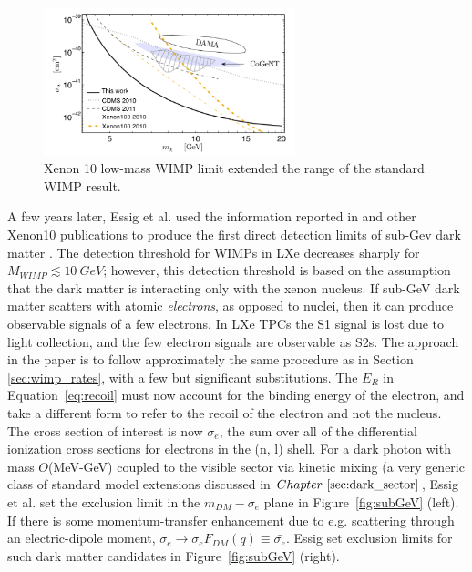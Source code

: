 \begin{figure}[htbp]
\begin{center}
\includegraphics[width=0.65\textwidth]{figures/lxetpcs/xenon10lowmass.png}
\caption{Xenon 10 low-mass WIMP limit extended the range of the standard WIMP result. }
\label{fig:xenon10lowmass}
\end{center}
\end{figure}


A few years later, Essig et al. used the information reported in \cite{Angle2011} and other Xenon10 publications to produce the first direct detection limits of sub-Gev dark matter \cite{Essig2012}. The detection threshold for \ac{WIMP}s in \ac{LXe} decreases sharply for $M_{WIMP} \lesssim 10~GeV$; however, this detection threshold is based on the assumption that the dark matter is interacting only with the xenon nucleus. If sub-GeV dark matter scatters with atomic \textit{electrons}, as opposed to nuclei, then it can produce observable signals of a few electrons. In \ac{LXe} \ac{TPC}s the S1 signal is lost due to light collection, and the few electron signals are observable as S2s. The approach in the paper is to follow approximately the same procedure as in Section~ \ref{sec:wimp_rates}, with a few but significant substitutions. The $E_{R}$ in Equation~\ref{eq:recoil} must now account for the binding energy of the electron, and take a different form to refer to the recoil of the electron and not the nucleus. The cross section of interest is now $\sigma_{e}$, the sum over all of the differential ionization cross sections for electrons in the (n, l) shell. For a dark photon with mass $O$(MeV-GeV) coupled to the visible sector via kinetic mixing (a very generic class of standard model extensions discussed in $Chapter~\ref{sec:dark_sector}$, Essig et al. set the exclusion limit in the $m_{DM}-\sigma_{e}$ plane in Figure~\ref{fig:subGeV} (left). If there is some momentum-transfer enhancement due to e.g. scattering through an electric-dipole moment, $\sigma_{e} \longrightarrow \sigma_{e}F_{DM}(q) \equiv \bar{\sigma_{e}}$. Essig set exclusion limits for such dark matter candidates in Figure~\ref{fig:subGeV} (right).


